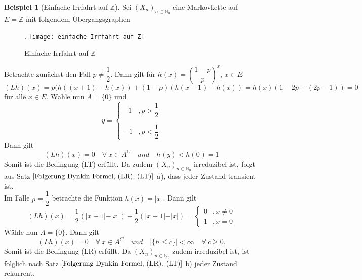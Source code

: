 \documentclass[a4paper,12pt]{scrartcl}
\theoremstyle{definition}
\newtheorem{bsp}{Beispiel}[section]
\begin{document}
\begin{bsp}[Einfache Irrfahrt auf $\mathbb{Z}$] Sei $(X_{n})_{n \in \mathbb{N}_{0}}$ eine Markovkette auf $E = \mathbb{Z}$ mit folgendem Übergangsgraphen
\begin{figure}[H].
\centering
\texttt{[image: einfache Irrfahrt auf Z]}
\caption{Einfache Irrfahrt auf $\mathbb{Z}$}
\end{figure}
\noindent
Betrachte zunächst den Fall $p \neq \dfrac{1}{2}$. Dann gilt für $h(x) = {\left(\dfrac{1-p}{p} \right)}^{x}$, $x \in E$
\begin{equation*}
(Lh)(x) = p(h((x+1)-h(x)) + (1-p)(h(x-1)-h(x)) = h(x)(1-2p+(2p-1)) = 0
\end{equation*}
für alle $x \in E$. Wähle nun $A = \lbrace 0 \rbrace$ und 
\begin{equation*}
y =
\begin{cases}
\: \: \:1 & , p > \dfrac{1}{2}\\
& \\
-1 & , p < \dfrac{1}{2}
\end{cases}
\end{equation*}
Dann gilt 
\begin{equation*}
(Lh)(x) = 0 \quad \forall \: x \in A^{C} \quad und \quad h(y) < h(0) = 1
\end{equation*}
Somit ist die Bedingung (LT) erfüllt. Da zudem $(X_{n})_{n \in \mathbb{N}_{0}}$ irreduzibel ist, folgt aus Satz $\ref{Folgerung Dynkin Formel, (LR), (LT)}$ a), dass jeder Zustand transient ist.
\\
Im Falle $p = \dfrac{1}{2}$ betrachte die Funktion $h(x) = \vert x \vert$. Dann gilt
\begin{equation*}
(Lh)(x) = \dfrac{1}{2} (\vert x +1 \vert - \vert x \vert) + \dfrac{1}{2}(\vert x -1 \vert - \vert x \vert) =
\begin{cases}
0 & , x \neq 0\\

1 & , x = 0
\end{cases}
\end{equation*}
Wähle nun $A = \lbrace 0 \rbrace$. Dann gilt
\begin{equation*}
(Lh)(x) = 0 \quad \forall \: x \in A^{C} \quad und \quad \vert \lbrace h \leq c\rbrace \vert < \infty \quad \forall \: c \geq 0.
\end{equation*}
Somit ist die Bedingung (LR) erfüllt. Da $(X_{n})_{n \in \mathbb{N}_{0}}$ zudem irreduzibel ist, ist folglich nach Satz $\ref{Folgerung Dynkin Formel, (LR), (LT)}$ b) jeder Zustand rekurrent.
\end{bsp}
\end{document}
